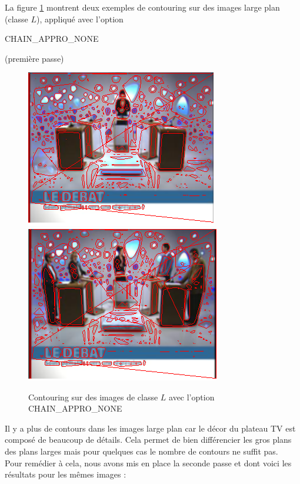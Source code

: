 \documentclass{book}
\begin{document}
La figure \ref{contouringL1} montrent deux exemples de contouring sur des images \og large plan \fg{} (classe $L$), appliqué
avec l'option \begin{itshape}CHAIN\_APPRO\_NONE\end{itshape} (première passe)

\begin{figure}[H]
\begin{center}
\includegraphics[scale=0.5]{contouring_exemple1_classeL_passe1.png}
\includegraphics[scale=0.5]{contouring_exemple2_classeL_passe1.png}
\end{center}
\caption{Contouring sur des images de classe $L$ avec l'option CHAIN\_APPRO\_NONE}
\label{contouringL1}
\end{figure}

Il y a plus de contours dans les images \og large plan \fg{} car le décor du plateau TV est composé de beaucoup de détails.
Cela permet de bien différencier les gros plans des plans larges mais pour quelques cas le nombre de 
contours ne suffit pas.\\
Pour remédier à cela, nous avons mis en place la seconde passe et dont voici les résultats pour les mêmes 
images : 
\end{document}
